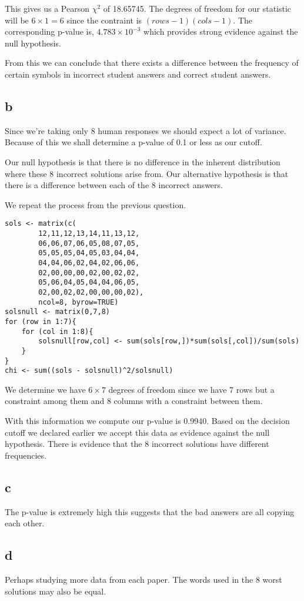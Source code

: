 \documentclass{article}
\begin{document}
This gives us a Pearson $\chi^2$ of 18.65745. The degrees of freedom for our
statistic will be $6 \times 1 = 6$ since the contraint is $(rows-1)(cols-1)$.
The corresponding p-value is, $4.783 \times 10^{-3}$ which provides strong
evidence against the null hypothesis.

From this we can conclude that there exists a difference between the frequency
of certain symbols in incorrect student answers and correct student answers.

\subsection{b}
Since we're taking only 8 human responses we should expect a lot of variance.
Because of this we shall determine a p-value of 0.1 or less as our cutoff.

Our null hypothesis is that there is no difference in the inherent distribution
where these 8 incorrect solutions arise from. Our alternative hypothesis is that
there is a difference between each of the 8 incorrect answers.

We repeat the process from the previous question.
\begin{verbatim}
sols <- matrix(c(
        12,11,12,13,14,11,13,12,
        06,06,07,06,05,08,07,05,
        05,05,05,04,05,03,04,04,
        04,04,06,02,04,02,06,06,
        02,00,00,00,02,00,02,02,
        05,06,04,05,04,04,06,05,
        02,00,02,02,00,00,00,02),
        ncol=8, byrow=TRUE)
solsnull <- matrix(0,7,8)
for (row in 1:7){
    for (col in 1:8){
        solsnull[row,col] <- sum(sols[row,])*sum(sols[,col])/sum(sols)
    }
}
chi <- sum((sols - solsnull)^2/solsnull)
\end{verbatim}

We determine we have $6 \times 7$ degrees of freedom since we have 7 rows but a 
constraint among them and 8 columns with a constraint between them.

With this information we compute our p-value is 0.9940.
Based on the decision cutoff we declared earlier we accept this data as evidence
against the null hypothesis. There is evidence that the 8 incorrect solutions
have different frequencies.

\subsection{c}
The p-value is extremely high this suggests that the bad answers are all copying
each other.

\subsection{d}
Perhaps studying more data from each paper. The words used in the 8 worst
solutions may also be equal.
\end{document}
